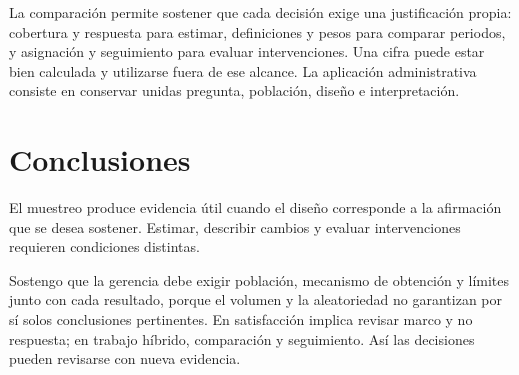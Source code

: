 La comparación permite sostener que cada decisión exige una justificación propia: cobertura y respuesta para estimar, definiciones y pesos para comparar periodos, y asignación y seguimiento para evaluar intervenciones. Una cifra puede estar bien calculada y utilizarse fuera de ese alcance. La aplicación administrativa consiste en conservar unidas pregunta, población, diseño e interpretación.

\section{Conclusiones}
El muestreo produce evidencia útil cuando el diseño corresponde a la afirmación que se desea sostener. Estimar, describir cambios y evaluar intervenciones requieren condiciones distintas.

Sostengo que la gerencia debe exigir población, mecanismo de obtención y límites junto con cada resultado, porque el volumen y la aleatoriedad no garantizan por sí solos conclusiones pertinentes. En satisfacción implica revisar marco y no respuesta; en trabajo híbrido, comparación y seguimiento. Así las decisiones pueden revisarse con nueva evidencia.


